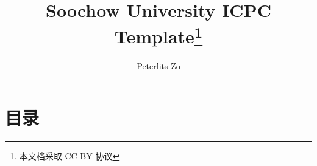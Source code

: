 \documentclass[a4paper, 9pt]{ctexbook}
\title{Soochow University ICPC Template\thanks{本文档采取 CC-BY 协议}}
\author{Peterlits Zo}
\begin{document}
\maketitle

\twocolumn
\chapter*{目录}
\tableofcontents
\newpage
















\end{document}
